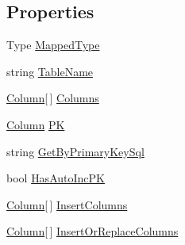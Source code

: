 \subsection*{Properties}
\begin{DoxyCompactItemize}
\item 
Type \hyperlink{class_s_q_lite_1_1_table_mapping_a33ac15671e4d3371a8fa2834d17fb8e8}{Mapped\+Type}
\item 
string \hyperlink{class_s_q_lite_1_1_table_mapping_aa4f8f4620985ceca6db33ab061649f29}{Table\+Name}
\item 
\hyperlink{class_s_q_lite_1_1_table_mapping_1_1_column}{Column}\mbox{[}$\,$\mbox{]} \hyperlink{class_s_q_lite_1_1_table_mapping_ae108c0714634387100fccf5001b73672}{Columns}
\item 
\hyperlink{class_s_q_lite_1_1_table_mapping_1_1_column}{Column} \hyperlink{class_s_q_lite_1_1_table_mapping_a322b91d1a0085e98355a830c970aee05}{P\+K}
\item 
string \hyperlink{class_s_q_lite_1_1_table_mapping_acf2d379f40ca0ac2cfa6204a1d50e201}{Get\+By\+Primary\+Key\+Sql}
\item 
bool \hyperlink{class_s_q_lite_1_1_table_mapping_a93b2497900e37cb5ef4a32597934020e}{Has\+Auto\+Inc\+P\+K}
\item 
\hyperlink{class_s_q_lite_1_1_table_mapping_1_1_column}{Column}\mbox{[}$\,$\mbox{]} \hyperlink{class_s_q_lite_1_1_table_mapping_a07daa9501f45c3a52cd834cb65fa86a2}{Insert\+Columns}
\item 
\hyperlink{class_s_q_lite_1_1_table_mapping_1_1_column}{Column}\mbox{[}$\,$\mbox{]} \hyperlink{class_s_q_lite_1_1_table_mapping_ac88c964d9ed3ad2c6827ccfbe8765187}{Insert\+Or\+Replace\+Columns}
\end{DoxyCompactItemize}


